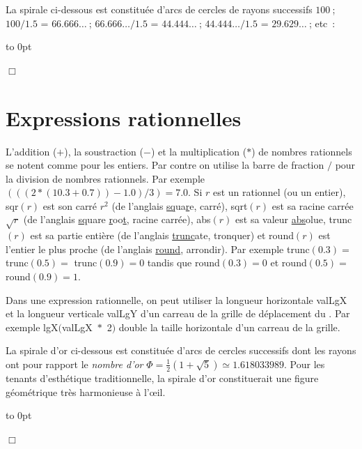 \begin{exemple}{\rm
La spirale ci-dessous est constituée d'arcs de cercles de rayons successifs
$100$$\:$; $100 / 1.5$ = $66.666\ldots$$\:$; $66.666\ldots / 1.5$ = $44.444\ldots$$\:$;
$44.444\ldots / 1.5$ = $29.629\ldots$$\:$; etc~:

 {\raggedright 
 \vbox to 0pt{}
 
 }
\noindent $\Box$ }\end{exemple}

\section{Expressions rationnelles}
L'addition ($+$), la soustraction ($-$) et la multiplication ($\ast$) de nombres rationnels se notent
comme pour les entiers. Par contre on utilise la barre de fraction $/$ pour la division de nombres 
rationnels. Par exemple $(((2 * (10.3 + 0.7)) - 1.0) / 3) = 7.0$. Si $r$ est un rationnel (ou un 
entier), {\idt sqr$(r)$} est son carré $r^{2}$ (de l'anglais \underline{sq}ua\underline{r}e, 
carré), {\idt sqrt$(r)$} est sa racine carrée $\sqrt{r}$ (de l'anglais \underline{sq}uare 
\underline{r}oo\underline{t}, racine carrée), {\idt abs$(r)$} est sa valeur \underline{abs}olue,  
{\idt trunc$(r)$} est sa partie entière (de l'anglais \underline{trunc}ate, tronquer) et 
{\idt round$(r)$} est l'entier le plus proche (de l'anglais \underline{round}, arrondir). Par exemple
{\idt trunc$(0.3) = $ trunc$(0.5) = $ trunc$(0.9) = 0$} tandis que
{\idt round$(0.3) = 0$} et {\idt round$(0.5) = $ round$(0.9) = 1$}.

Dans une expression rationnelle, on peut utiliser la longueur horizontale {\idt valLgX} et la
longueur verticale {\idt valLgY} d'un carreau de la grille de déplacement du \robot. Par exemple
{\idt lgX$($valLgX\ $\ast$\ 2$)$} double la taille horizontale d'un carreau de la grille.

\begin{exemple}[Spirale d'or]{\rm
La spirale d'or ci-dessous est constituée d'arcs de cercles successifs dont les rayons
ont pour rapport le {\em nombre d'or\/}
$\Phi = \frac{1}{2}(1 + \sqrt{5}) \simeq 1.618033989$. Pour les tenants d'esthétique
traditionnelle, la spirale d'or constituerait une figure géométrique très harmonieuse
à l'œil.

{\raggedright 
 \vbox to 0pt{}
 
 }
\noindent $\Box$ }\end{exemple}

